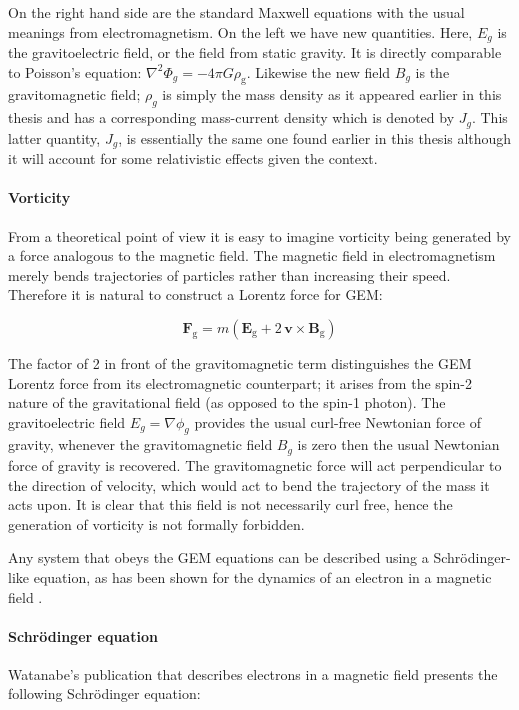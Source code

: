 \noindent On the right hand side are the standard Maxwell equations with the usual meanings from electromagnetism. On the left we have new quantities. Here, $E_g$ is the gravitoelectric field, or the field from static gravity. It is directly comparable to Poisson's equation: $\nabla^2 \Phi_g = -4 \pi G \rho_\text{g}$. Likewise the new field $B_g$ is the gravitomagnetic field; $\rho_g$ is simply the mass density as it appeared earlier in this thesis and has a corresponding mass-current density which is denoted by $J_g$. This latter quantity, $J_g$, is essentially the same one found earlier in this thesis although it will account for some relativistic effects given the context.

\paragraph{Vorticity}
From a theoretical point of view it is easy to imagine vorticity being generated by a force analogous to the magnetic field. The magnetic field in electromagnetism merely bends trajectories of particles rather than increasing their speed. Therefore it is natural to construct a Lorentz force for GEM:

\begin{equation}
\mathbf{F}_\text{g} = m \left( \mathbf{E}_\text{g} + 2\,\mathbf{v} \times \mathbf{B}_\text{g} \right) 
\end{equation}

\noindent The factor of 2 in front of the gravitomagnetic term distinguishes the GEM Lorentz force from its electromagnetic counterpart; it arises from the spin-2 nature of the gravitational field (as opposed to the spin-1 photon). The gravitoelectric field $E_g = \nabla\phi_g$ provides the usual curl-free Newtonian force of gravity, whenever the gravitomagnetic field $B_g$ is zero then the usual Newtonian force of gravity is recovered. The gravitomagnetic force will act perpendicular to the direction of velocity, which would act to bend the trajectory of the mass it acts upon. It is clear that this field is not necessarily curl free, hence the generation of vorticity is not formally forbidden.

Any system that obeys the GEM equations can be described using a Schr\"odinger-like equation, as has been shown for the dynamics of an electron in a magnetic field \citep{bib_wat2}.

\paragraph{Schr\"odinger equation}
Watanabe's publication \citep{bib_wat2} that describes electrons in a magnetic field presents the following Schr\"odinger equation:

